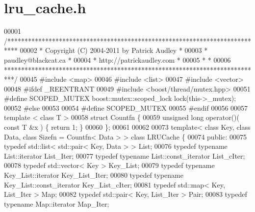 \section{lru\_\-cache.h}

\begin{DoxyCode}
00001 \textcolor{comment}{/***************************************************************************}
00002 \textcolor{comment}{ *   Copyright (C) 2004-2011 by Patrick Audley                             *}
00003 \textcolor{comment}{ *   paudley@blackcat.ca                                                   *}
00004 \textcolor{comment}{ *   http://patrickaudley.com                                              *}
00005 \textcolor{comment}{ *                                                                         *}
00006 \textcolor{comment}{ ***************************************************************************/}
00045 \textcolor{preprocessor}{#include <map>}
00046 \textcolor{preprocessor}{#include <list>}
00047 \textcolor{preprocessor}{#include <vector>}
00048 \textcolor{preprocessor}{#ifdef \_REENTRANT}
00049 \textcolor{preprocessor}{}\textcolor{preprocessor}{#include <boost/thread/mutex.hpp>}
00051 \textcolor{preprocessor}{#define SCOPED\_MUTEX  boost::mutex::scoped\_lock lock(this->\_mutex);}
00052 \textcolor{preprocessor}{}\textcolor{preprocessor}{#else}
00053 \textcolor{preprocessor}{}
00054 \textcolor{preprocessor}{#define SCOPED\_MUTEX}
00055 \textcolor{preprocessor}{}\textcolor{preprocessor}{#endif}
00056 \textcolor{preprocessor}{}
00057 \textcolor{keyword}{template} < \textcolor{keyword}{class} T >
00058 \textcolor{keyword}{struct }Countfn \{
00059                 \textcolor{keywordtype}{unsigned} \textcolor{keywordtype}{long} operator()( \textcolor{keyword}{const} T &x ) \{ \textcolor{keywordflow}{return} 1; \}
00060 \};
00061 
00062 
00073 \textcolor{keyword}{template}< \textcolor{keyword}{class} Key, \textcolor{keyword}{class} Data, \textcolor{keyword}{class} Sizefn = Countfn< Data > > \textcolor{keyword}{class }LRUCache 
      \{
00074         \textcolor{keyword}{public}:
00075                 \textcolor{keyword}{typedef} std::list< std::pair< Key, Data > > List;         
00076                 \textcolor{keyword}{typedef} \textcolor{keyword}{typename} List::iterator List\_Iter;                
00077                 \textcolor{keyword}{typedef} \textcolor{keyword}{typename} List::const\_iterator List\_cIter;         
00078                 \textcolor{keyword}{typedef} std::vector< Key > Key\_List;                      
00079                 \textcolor{keyword}{typedef} \textcolor{keyword}{typename} Key\_List::iterator Key\_List\_Iter;        
00080                 \textcolor{keyword}{typedef} \textcolor{keyword}{typename} Key\_List::const\_iterator Key\_List\_cIter; 
00081                 \textcolor{keyword}{typedef} std::map< Key, List\_Iter > Map;                   
00082                 \textcolor{keyword}{typedef} std::pair< Key, List\_Iter > Pair;                 
00083                 \textcolor{keyword}{typedef} \textcolor{keyword}{typename} Map::iterator Map\_Iter;                         
                 

\end{DoxyCode}
